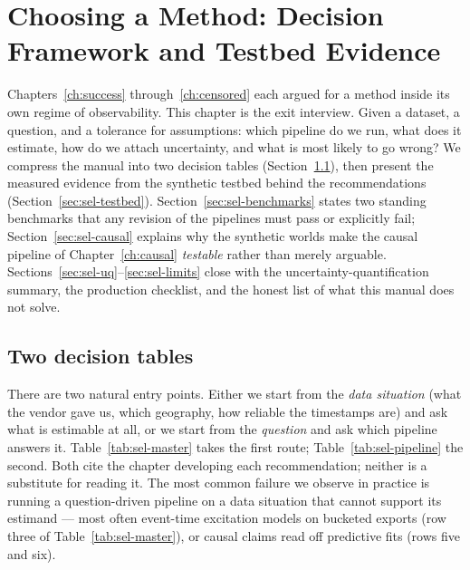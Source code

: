 \chapter{Choosing a Method: Decision Framework and Testbed Evidence}
\label{ch:selection}

Chapters~\ref{ch:success} through~\ref{ch:censored} each argued for a method inside its own regime of
observability. This chapter is the exit interview. Given a dataset, a question, and a tolerance for
assumptions: which pipeline do we run, what does it estimate, how do we attach uncertainty, and what is most
likely to go wrong? We compress the manual into two decision tables (Section~\ref{sec:sel-decisions}), then
present the measured evidence from the synthetic testbed behind the recommendations
(Section~\ref{sec:sel-testbed}). Section~\ref{sec:sel-benchmarks} states two standing benchmarks that any
revision of the pipelines must pass or explicitly fail; Section~\ref{sec:sel-causal} explains why the
synthetic worlds make the causal pipeline of Chapter~\ref{ch:causal} \emph{testable} rather than merely
arguable. Sections~\ref{sec:sel-uq}--\ref{sec:sel-limits} close with the uncertainty-quantification summary,
the production checklist, and the honest list of what this manual does not solve.

\section{Two decision tables}
\label{sec:sel-decisions}

There are two natural entry points. Either we start from the \emph{data situation} (what the vendor gave us,
which geography, how reliable the timestamps are) and ask what is estimable at all, or we start from the
\emph{question} and ask which pipeline answers it. Table~\ref{tab:sel-master} takes the first route;
Table~\ref{tab:sel-pipeline} the second. Both cite the chapter developing each recommendation; neither is a
substitute for reading it. The most common failure we observe in practice is running a question-driven
pipeline on a data situation that cannot support its estimand --- most often event-time excitation models on
bucketed exports (row three of Table~\ref{tab:sel-master}), or causal claims read off predictive fits (rows
five and six).

